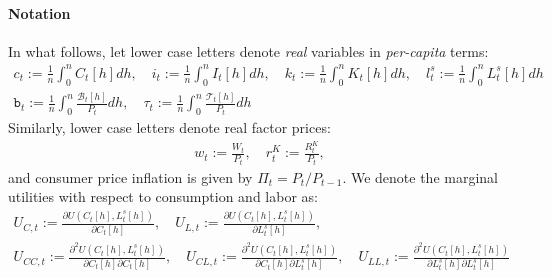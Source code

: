 \paragraph{Notation}
In what follows, let lower case letters denote \emph{real} variables in \emph{per-capita} terms:
\begin{gather*}
c_{t} := \frac{1}{n}\int_{0}^{n} C_{t}[h] dh
,\quad
i_{t} := \frac{1}{n}\int_{0}^{n} I_{t}[h] dh
,\quad
k_{t} := \frac{1}{n}\int_{0}^{n} K_{t}[h] dh
,\quad
l^{s}_{t} := \frac{1}{n}\int_{0}^{n} L^{s}_{t}[h] dh
\\
\mathtt{b}_{t} := \frac{1}{n}\int_{0}^{n} \frac{\mathcal{B}_{t}[h]}{P_{t}} dh
,\quad
\tau_{t} := \frac{1}{n}\int_{0}^{n} \frac{\mathcal{T}_{t}[h]}{P_{t}} dh
\end{gather*}
Similarly, lower case letters denote real factor prices:
\begin{align*}
w_{t} := \frac{W_{t}}{P_{t}},
\quad
r^{K}_{t} := \frac{R^{K}_{t}}{P_t},
\end{align*}
and consumer price inflation is given by \(\Pi_{t} = P_{t}/P_{t-1}\).
We denote the marginal utilities with respect to consumption and labor as:
\begin{gather*}
U_{C,t} := \frac{\partial U(C_{t}[h],L^{s}_{t}[h])}{\partial C_{t}[h]},
\quad
U_{L,t} := \frac{\partial U(C_{t}[h],L^{s}_{t}[h])}{\partial L^{s}_{t}[h]},
\\
U_{CC,t} := \frac{\partial^2 U(C_{t}[h],L^{s}_{t}[h])}{\partial C_{t}[h] \partial C_{t}[h]},
\quad
U_{CL,t} := \frac{\partial^2 U(C_{t}[h],L^{s}_{t}[h])}{\partial C_{t}[h] \partial L^{s}_{t}[h]},
\quad
U_{LL,t} := \frac{\partial^2 U(C_{t}[h],L^{s}_{t}[h])}{\partial L^{s}_{t}[h] \partial L^{s}_{t}[h]}
\end{gather*}

\newpage
